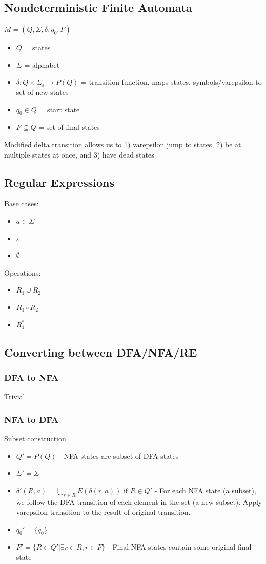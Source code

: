 \documentclass{article}
\begin{document}
\subsection{Nondeterministic Finite Automata}
$M = (Q, \Sigma, \delta, q_0, F)$
\begin{itemize}
    \item $Q$ = states
    \item $\Sigma$ = alphabet
    \item $\delta : Q \times \Sigma_{\varepsilon} \rightarrow P(Q)$ = transition function, maps states, symbols/varepsilon to set of new states
    \item $q_0 \in Q$ = start state
    \item $F \subseteq Q$ = set of final states
\end{itemize}
Modified delta transition allows us to 1) varepsilon jump to states, 2) be at multiple states at once, and 3) have dead states

\subsection{Regular Expressions}
Base cases:
\begin{itemize}
    \item $a \in \Sigma$
    \item $\varepsilon$
    \item $\emptyset$
\end{itemize}
Operations:
\begin{itemize}
    \item $R_1 \cup R_2$
    \item $R_1 \circ R_2$
    \item $R_1^*$
\end{itemize}

\subsection{Converting between DFA/NFA/RE}

\subsubsection{DFA to NFA}
Trivial

\subsubsection{NFA to DFA}
Subset construction
\begin{itemize}
    \item $Q' = P(Q)$ - NFA states are subset of DFA states
    \item $\Sigma' = \Sigma$
    \item $\delta'(R, a) = \bigcup_{r \in R} E(\delta(r, a))$ if $R \in Q'$ - For each NFA state (a subset), we follow the DFA transition of each element in the set (a new subset). Apply varepsilon transition to the result of original transition.
    \item $q_0' = \{q_0\}$
    \item $F' = \{R \in Q' | \exists r \in R, r \in F\}$ - Final NFA states contain some original final state
\end{itemize}
\end{document}
